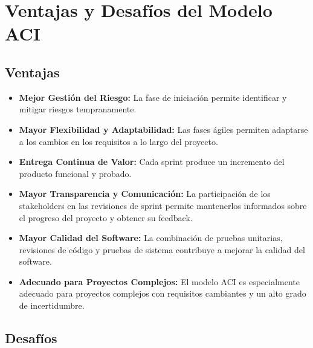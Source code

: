 \documentclass[12pt, spanish]{article}
\begin{document}
\section*{Ventajas y Desafíos del Modelo ACI}

\subsection*{Ventajas}

\begin{itemize}
    \item \textbf{Mejor Gestión del Riesgo:} La fase de iniciación permite identificar y mitigar riesgos tempranamente.
    \item \textbf{Mayor Flexibilidad y Adaptabilidad:} Las fases ágiles permiten adaptarse a los cambios en los requisitos a lo largo del proyecto.
    \item \textbf{Entrega Continua de Valor:} Cada sprint produce un incremento del producto funcional y probado.
    \item \textbf{Mayor Transparencia y Comunicación:} La participación de los stakeholders en las revisiones de sprint permite mantenerlos informados sobre el progreso del proyecto y obtener su feedback.
    \item \textbf{Mayor Calidad del Software:} La combinación de pruebas unitarias, revisiones de código y pruebas de sistema contribuye a mejorar la calidad del software.
    \item \textbf{Adecuado para Proyectos Complejos:} El modelo ACI es especialmente adecuado para proyectos complejos con requisitos cambiantes y un alto grado de incertidumbre.
\end{itemize}

\subsection*{Desafíos}
\end{document}
